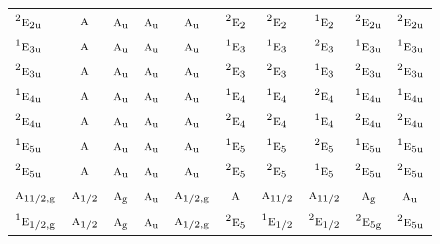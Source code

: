 \documentclass[10pt,a4paper]{article}
\numberwithin{equation}{section}
\newcommand{\irr}[1]{\text{\normalfont\scshape #1}}
\newcommand{\conjpair}[1]{{}^{#1}}
\newcommand{\ptag}[1]{\mathrm{#1}}
\begin{document}
{\begin{longtable}{@{}lccccccccc@{}}
$\conjpair{2}\irr{e}_{2\ptag{u}}$ & $\irr{a}$ & $\irr{a}_{\ptag{u}}$ & $\irr{a}_{\ptag{u}}$ & $\irr{a}_{\ptag{u}}$ & $\conjpair{2}\irr{e}_{2}$ & $\conjpair{2}\irr{e}_{2}$ & $\conjpair{1}\irr{e}_{2}$ & $\conjpair{2}\irr{e}_{2\ptag{u}}$ & $\conjpair{2}\irr{e}_{2\ptag{u}}$\\
$\conjpair{1}\irr{e}_{3\ptag{u}}$ & $\irr{a}$ & $\irr{a}_{\ptag{u}}$ & $\irr{a}_{\ptag{u}}$ & $\irr{a}_{\ptag{u}}$ & $\conjpair{1}\irr{e}_{3}$ & $\conjpair{1}\irr{e}_{3}$ & $\conjpair{2}\irr{e}_{3}$ & $\conjpair{1}\irr{e}_{3\ptag{u}}$ & $\conjpair{1}\irr{e}_{3\ptag{u}}$\\
$\conjpair{2}\irr{e}_{3\ptag{u}}$ & $\irr{a}$ & $\irr{a}_{\ptag{u}}$ & $\irr{a}_{\ptag{u}}$ & $\irr{a}_{\ptag{u}}$ & $\conjpair{2}\irr{e}_{3}$ & $\conjpair{2}\irr{e}_{3}$ & $\conjpair{1}\irr{e}_{3}$ & $\conjpair{2}\irr{e}_{3\ptag{u}}$ & $\conjpair{2}\irr{e}_{3\ptag{u}}$\\
$\conjpair{1}\irr{e}_{4\ptag{u}}$ & $\irr{a}$ & $\irr{a}_{\ptag{u}}$ & $\irr{a}_{\ptag{u}}$ & $\irr{a}_{\ptag{u}}$ & $\conjpair{1}\irr{e}_{4}$ & $\conjpair{1}\irr{e}_{4}$ & $\conjpair{2}\irr{e}_{4}$ & $\conjpair{1}\irr{e}_{4\ptag{u}}$ & $\conjpair{1}\irr{e}_{4\ptag{u}}$\\
$\conjpair{2}\irr{e}_{4\ptag{u}}$ & $\irr{a}$ & $\irr{a}_{\ptag{u}}$ & $\irr{a}_{\ptag{u}}$ & $\irr{a}_{\ptag{u}}$ & $\conjpair{2}\irr{e}_{4}$ & $\conjpair{2}\irr{e}_{4}$ & $\conjpair{1}\irr{e}_{4}$ & $\conjpair{2}\irr{e}_{4\ptag{u}}$ & $\conjpair{2}\irr{e}_{4\ptag{u}}$\\
$\conjpair{1}\irr{e}_{5\ptag{u}}$ & $\irr{a}$ & $\irr{a}_{\ptag{u}}$ & $\irr{a}_{\ptag{u}}$ & $\irr{a}_{\ptag{u}}$ & $\conjpair{1}\irr{e}_{5}$ & $\conjpair{1}\irr{e}_{5}$ & $\conjpair{2}\irr{e}_{5}$ & $\conjpair{1}\irr{e}_{5\ptag{u}}$ & $\conjpair{1}\irr{e}_{5\ptag{u}}$\\
$\conjpair{2}\irr{e}_{5\ptag{u}}$ & $\irr{a}$ & $\irr{a}_{\ptag{u}}$ & $\irr{a}_{\ptag{u}}$ & $\irr{a}_{\ptag{u}}$ & $\conjpair{2}\irr{e}_{5}$ & $\conjpair{2}\irr{e}_{5}$ & $\conjpair{1}\irr{e}_{5}$ & $\conjpair{2}\irr{e}_{5\ptag{u}}$ & $\conjpair{2}\irr{e}_{5\ptag{u}}$\\
$\irr{a}_{11/2,\ptag{g}}$ & $\irr{a}_{1/2}$ & $\irr{a}_{\ptag{g}}$ & $\irr{a}_{\ptag{u}}$ & $\irr{a}_{1/2,\ptag{g}}$ & $\irr{a}$ & $\irr{a}_{11/2}$ & $\irr{a}_{11/2}$ & $\irr{a}_{\ptag{g}}$ & $\irr{a}_{\ptag{u}}$\\
$\conjpair{1}\irr{e}_{1/2,\ptag{g}}$ & $\irr{a}_{1/2}$ & $\irr{a}_{\ptag{g}}$ & $\irr{a}_{\ptag{u}}$ & $\irr{a}_{1/2,\ptag{g}}$ & $\conjpair{2}\irr{e}_{5}$ & $\conjpair{1}\irr{e}_{1/2}$ & $\conjpair{2}\irr{e}_{1/2}$ & $\conjpair{2}\irr{e}_{5\ptag{g}}$ & $\conjpair{2}\irr{e}_{5\ptag{u}}$\\

\end{longtable}}
\end{document}
